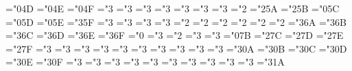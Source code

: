 \mathchardef\vartriangle="0\msa@4D
\mathchardef\blacktriangle="0\msa@4E
\mathchardef\triangledown="0\msa@4F \mathchardef\eqcirc="3
\mathchardef\lesseqgtr="3 \mathchardef\gtreqless="3
\mathchardef\lesseqqgtr="3
\mathchardef\gtreqqless="3
\mathchardef\Rrightarrow="3
\mathchardef\Lleftarrow="3 \mathchardef\veebar="2
\mathchardef\barwedge="2\msa@5A
\mathchardef\doublebarwedge="2\msa@5B \mathchardef\angle="0\msa@5C
\mathchardef\measuredangle="0\msa@5D
\mathchardef\sphericalangle="0\msa@5E
\mathchardef\varpropto="3\msa@5F \mathchardef\smallsmile="3
\mathchardef\smallfrown="3 \mathchardef\Subset="3
\mathchardef\Supset="3 \mathchardef\Cup="2
\let\doublecup=\Cup
\mathchardef\Cap="2
\let\doublecap=\Cap
\mathchardef\curlywedge="2 \mathchardef\curlyvee="2
\mathchardef\leftthreetimes="2
\mathchardef\rightthreetimes="2
\mathchardef\subseteqq="3\msa@6A \mathchardef\supseteqq="3\msa@6B
\mathchardef\bumpeq="3\msa@6C \mathchardef\Bumpeq="3\msa@6D
\mathchardef\lll="3\msa@6E
\let\llless=\lll
\mathchardef\ggg="3\msa@6F
\let\gggtr=\ggg
\mathchardef\circledS="0 \mathchardef\pitchfork="3
\mathchardef\dotplus="2 \mathchardef\backsim="3
\mathchardef\backsimeq="3 \mathchardef\complement="0\msa@7B
\mathchardef\intercal="2\msa@7C \mathchardef\circledcirc="2\msa@7D
\mathchardef\circledast="2\msa@7E
\mathchardef\circleddash="2\msa@7F
\def\ulcorner{\delimiter"4\msa@70\msa@70 }
\def\urcorner{\delimiter"5\msa@71\msa@71 }
\def\llcorner{\delimiter"4\msa@78\msa@78 }
\def\lrcorner{\delimiter"5\msa@79\msa@79 }
\def\yen{\mathhexbox\msa@55 }
\def\checkmark{\mathhexbox\msa@58 }
\def\circledR{\mathhexbox\msa@72 }
\def\maltese{\mathhexbox\msa@7A }
\mathchardef\lvertneqq="3 \mathchardef\gvertneqq="3
\mathchardef\nleq="3 \mathchardef\ngeq="3
\mathchardef\nless="3 \mathchardef\ngtr="3
\mathchardef\nprec="3 \mathchardef\nsucc="3
\mathchardef\lneqq="3 \mathchardef\gneqq="3
\mathchardef\nleqslant="3\msb@0A \mathchardef\ngeqslant="3\msb@0B
\mathchardef\lneq="3\msb@0C \mathchardef\gneq="3\msb@0D
\mathchardef\npreceq="3\msb@0E \mathchardef\nsucceq="3\msb@0F
\mathchardef\precnsim="3 \mathchardef\succnsim="3
\mathchardef\lnsim="3 \mathchardef\gnsim="3
\mathchardef\nleqq="3 \mathchardef\ngeqq="3
\mathchardef\precneqq="3 \mathchardef\succneqq="3
\mathchardef\precnapprox="3
\mathchardef\succnapprox="3 \mathchardef\lnapprox="3\msb@1A
